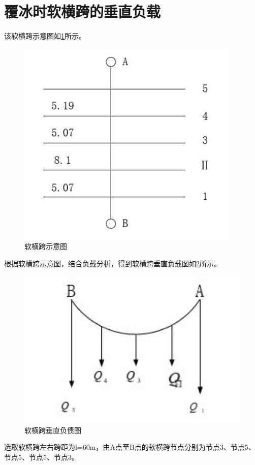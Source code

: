 \section{覆冰时软横跨的垂直负载}
该软横跨示意图如\ref{fig:软横跨示意图}所示。
\begin{figure}[H]
	\centering
	\includegraphics[width=0.7\linewidth]{figures/软横跨示意图}
	\caption{软横跨示意图}
	\label{fig:软横跨示意图}
\end{figure}
根据软横跨示意图，结合负载分析，得到软横跨垂直负载图如\ref{fig:软横跨垂直负债图}所示。
\begin{figure}[H]
	\centering
	\includegraphics[width=0.7\linewidth]{figures/软横跨垂直负债图}
	\caption{软横跨垂直负债图}
	\label{fig:软横跨垂直负债图}
\end{figure}

选取软横跨左右跨距为l=60m，由A点至B点的软横跨节点分别为节点3、节点5、节点5、节点5、节点3。

